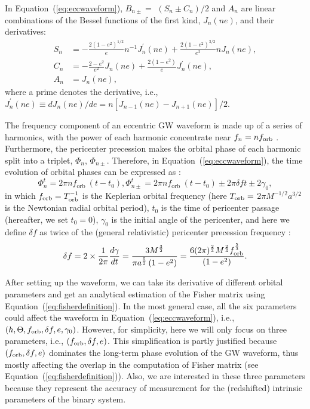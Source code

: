 \documentclass[%
 reprint,
 amsmath,amssymb,
 aps,
]{revtex4-2}
\begin{document}
In Equation~(\ref{eq:eccwaveform}), $B_{n \pm}=$ $\left(S_n \pm C_n\right) / 2$ and $A_n$ are linear combinations of the Bessel functions of the first kind, $J_n(n e)$, and their derivatives:
\begin{align}
S_n&=-\frac{2\left(1-e^2\right)^{1 / 2}}{e} {n^{-1}} J_n^{\prime}(n e)+\frac{2\left(1-e^2\right)^{3 / 2}}{e^2} n J_n(n e), \\\nonumber
C_n&=-\frac{2-e^2}{e^2} J_n(n e)+\frac{2\left(1-e^2\right)}{e} J_n^{\prime}(n e), \\\nonumber
A_n&=J_n(n e),
\end{align}
where a prime denotes the derivative, i.e., $J_n^{\prime}(n e) \equiv dJ_n(n e)/de=n\left[J_{n-1}(n e)-J_{n+1}(n e)\right] / 2$. 

The frequency component of an eccentric GW waveform is made up of a series of harmonics, with the power of each harmonic concentrate near $f_n=nf_{\rm orb}$ \citep[see, e.g., ][]{Peters64,Seto+01,Xuan23acc,Xuan+23b,Xuan24bkg}. Furthermore, the pericenter precession makes the orbital phase of each harmonic split into a triplet, $\Phi_n,\, \Phi_{n\pm}$. Therefore, in Equation~(\ref{eq:eccwaveform}), the time evolution of orbital phases can be expressed as \citep{Seto+01}: 
\begin{equation}
\Phi_n^t=2 \pi n f_{\text {orb }} (t-t_0), 
\Phi_{n \pm}^t=2 \pi n f_{\text {orb }}  (t-t_0) \pm 2 \pi \delta f t \pm 2 \gamma_0,
\label{eq:Phi}
\end{equation}
in which $f_{\rm orb}=T_{\rm orb}^{-1}$ is the Keplerian orbital frequency (here $T_{\rm orb}=$ $2 \pi M^{-1 / 2} a^{3 / 2}$ is the Newtonian radial orbital period), $t_0$ is the time of pericenter passage (hereafter, we set $t_0=0$),  $\gamma_0$ is the initial angle of the pericenter, and here we define $\delta f$ as twice of the (general relativistic) pericenter precession frequency \cite{Seto+01}:
\begin{equation}
\delta f= 2\times \frac{1}{2\pi} \frac{d\gamma}{dt}=\frac{3 M^{\frac{3}{2}}}{\pi a^{\frac{5}{2}}\left(1-e^2\right)}=\frac{6 (2 \pi )^{\frac{2}{3}}M^{\frac{2}{3}}f_{\rm orb}^{\frac{5}{3}}}{\left(1-e^2\right)} .  
\end{equation}


After setting up the waveform, we can take its derivative of different orbital parameters and get an analytical estimation of the Fisher matrix using Equation~(\ref{eq:fisherdefinition}). In the most general case, all the six parameters could affect the waveform in Equation~(\ref{eq:eccwaveform}), i.e., $(h, \Theta, f_{\rm orb}, \delta f, e, \gamma_0)$. However, for simplicity, here we will only focus on three parameters, i.e., $(f_{\rm orb}, \delta f,e)$. This simplification is partly justified because $(f_{\rm orb}, \delta f,e)$ dominates the long-term phase evolution of the GW waveform, thus mostly affecting the overlap in the computation of Fisher matrix (see Equation~(\ref{eq:fisherdefinition})). Also, we are interested in these three parameters because they represent the accuracy of measurement for the (redshifted) intrinsic parameters of the binary system.
\end{document}
